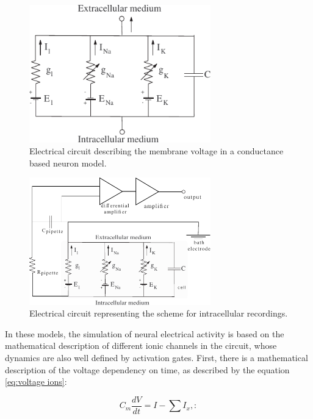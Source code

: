 \begin{figure}[htb!]
	\centering
	\includegraphics[width=0.7\textwidth]{./img/intro/electrical_circuit.pdf}
	\caption{Electrical circuit describing the membrane voltage in a conductance based neuron model.}
	\label{fig:electrical circuit}
\end{figure}

\begin{figure}[htb!]
	\centering
	\includegraphics[width=0.7\textwidth]{./img/intro/intracellular_recording_circuit.pdf}
	\caption{Electrical circuit representing the scheme for intracellular recordings.}
	\label{fig:clamp circuit}
\end{figure}


In these models, the simulation of neural electrical activity is based on the mathematical description of different ionic channels in the circuit, whose dynamics are also well defined by activation gates. First, there is a mathematical description of the voltage dependency on time, as described by the equation \ref{eq:voltage ions}:

\begin{equation}
 C_m \frac{dV}{dt} = I - \sum I_{x},
  \label{eq:voltage ions}:
\end{equation}

